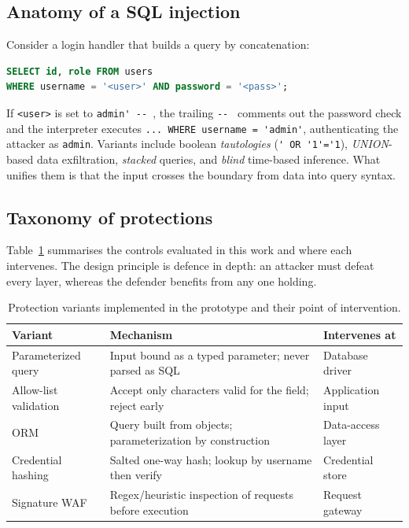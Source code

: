 \documentclass[pdflatex,sn-mathphys-num]{sn-jnl}
\begin{document}
\subsection{Anatomy of a SQL injection}
Consider a login handler that builds a query by concatenation:
\begin{lstlisting}[language=SQL]
SELECT id, role FROM users
WHERE username = '<user>' AND password = '<pass>';
\end{lstlisting}
If \verb|<user>| is set to \lstinline|admin' -- |, the trailing \verb|-- | comments
out the password check and the interpreter executes
\lstinline|... WHERE username = 'admin'|, authenticating the attacker as
\texttt{admin}. Variants include boolean \emph{tautologies}
(\lstinline|' OR '1'='1|), \emph{UNION}-based data exfiltration, \emph{stacked}
queries, and \emph{blind} time-based inference. What unifies them is that the input
crosses the boundary from data into query syntax.

\subsection{Taxonomy of protections}
Table~\ref{tab:taxonomy} summarises the controls evaluated in this work and where
each intervenes. The design principle is defence in depth: an attacker must defeat
every layer, whereas the defender benefits from any one holding.

\begin{table}[htbp]
\caption{Protection variants implemented in the prototype and their point of intervention.}\label{tab:taxonomy}
\begin{tabular}{@{}p{3.1cm}p{5.6cm}p{3.2cm}@{}}
\toprule
Variant & Mechanism & Intervenes at \\
\midrule
Parameterized query & Input bound as a typed parameter; never parsed as SQL & Database driver \\
Allow-list validation & Accept only characters valid for the field; reject early & Application input \\
ORM & Query built from objects; parameterization by construction & Data-access layer \\
Credential hashing & Salted one-way hash; lookup by username then verify & Credential store \\
Signature WAF & Regex/heuristic inspection of requests before execution & Request gateway \\
\bottomrule
\end{tabular}
\end{table}
\end{document}
